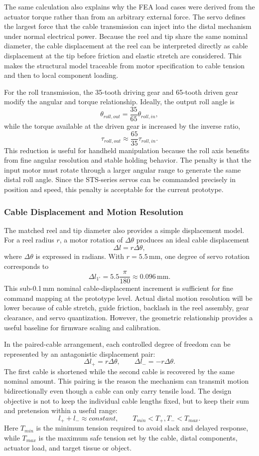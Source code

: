 The same calculation also explains why the FEA load cases were derived from the actuator torque rather than from an arbitrary external force. The servo defines the largest force that the cable transmission can inject into the distal mechanism under normal electrical power. Because the reel and tip share the same nominal diameter, the cable displacement at the reel can be interpreted directly as cable displacement at the tip before friction and elastic stretch are considered. This makes the structural model traceable from motor specification to cable tension and then to local component loading.

For the roll transmission, the 35-tooth driving gear and 65-tooth driven gear modify the angular and torque relationship. Ideally, the output roll angle is
\[
\theta_{roll,out}=\frac{35}{65}\theta_{roll,in},
\]
while the torque available at the driven gear is increased by the inverse ratio,
\[
\tau_{roll,out}\approx \frac{65}{35}\tau_{roll,in}.
\]
This reduction is useful for handheld manipulation because the roll axis benefits from fine angular resolution and stable holding behavior. The penalty is that the input motor must rotate through a larger angular range to generate the same distal roll angle. Since the STS-series servos can be commanded precisely in position and speed, this penalty is acceptable for the current prototype.

\subsubsection{Cable Displacement and Motion Resolution}
The matched reel and tip diameter also provides a simple displacement model. For a reel radius $r$, a motor rotation of $\Delta\theta$ produces an ideal cable displacement
\[
\Delta l = r\Delta\theta,
\]
where $\Delta\theta$ is expressed in radians. With $r=5.5\,\mathrm{mm}$, one degree of servo rotation corresponds to
\[
\Delta l_{1^\circ}=5.5\frac{\pi}{180}
\approx 0.096\,\mathrm{mm}.
\]
This sub-0.1\,mm nominal cable-displacement increment is sufficient for fine command mapping at the prototype level. Actual distal motion resolution will be lower because of cable stretch, guide friction, backlash in the reel assembly, gear clearance, and servo quantization. However, the geometric relationship provides a useful baseline for firmware scaling and calibration.

In the paired-cable arrangement, each controlled degree of freedom can be represented by an antagonistic displacement pair:
\[
\Delta l_+ = r\Delta\theta,\qquad
\Delta l_- = -r\Delta\theta .
\]
The first cable is shortened while the second cable is recovered by the same nominal amount. This pairing is the reason the mechanism can transmit motion bidirectionally even though a cable can only carry tensile load. The design objective is not to keep the individual cable lengths fixed, but to keep their sum and pretension within a useful range:
\[
l_+ + l_- \approx constant,\qquad
T_{min}<T_+,T_-<T_{max}.
\]
Here $T_{min}$ is the minimum tension required to avoid slack and delayed response, while $T_{max}$ is the maximum safe tension set by the cable, distal components, actuator load, and target tissue or object.

